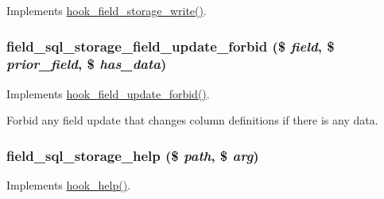 \label{field__sql__storage_8module_ac365998e2e667d3521edacc843ca8640}
Implements \hyperlink{group__field__storage_ga5663ebcfb92828cbed84a041e9a4b0d1}{hook\_\-field\_\-storage\_\-write()}. \hypertarget{field__sql__storage_8module_a486d857f7f3c62e6bc34944a9f6baa19}{
\subsubsection[{field\_\-sql\_\-storage\_\-field\_\-update\_\-forbid}]{\setlength{\rightskip}{0pt plus 5cm}field\_\-sql\_\-storage\_\-field\_\-update\_\-forbid (\$ {\em field}, \/  \$ {\em prior\_\-field}, \/  \$ {\em has\_\-data})}}
\label{field__sql__storage_8module_a486d857f7f3c62e6bc34944a9f6baa19}
Implements \hyperlink{group__field__crud_ga7bd0ccd40a9a3690b697b68d03f660a4}{hook\_\-field\_\-update\_\-forbid()}.

Forbid any field update that changes column definitions if there is any data. \hypertarget{field__sql__storage_8module_a26218c9f78c637bacce4a328234b3359}{
\subsubsection[{field\_\-sql\_\-storage\_\-help}]{\setlength{\rightskip}{0pt plus 5cm}field\_\-sql\_\-storage\_\-help (\$ {\em path}, \/  \$ {\em arg})}}
\label{field__sql__storage_8module_a26218c9f78c637bacce4a328234b3359}
Implements \hyperlink{group__hooks_ga5589c2714a782738e8851c4c90231f0e}{hook\_\-help()}. 